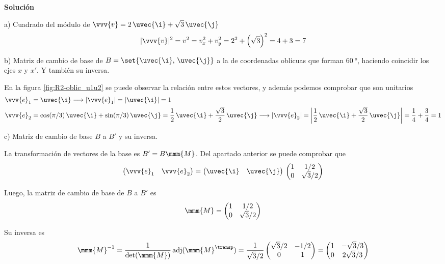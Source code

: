 \noindent
\textbf{Solución}

\noindent
a) Cuadrado del módulo de $\vvv{v} = 2\,\uvec{\i} + \sqrt{3}\,\uvec{\j}$
\[
  |\vvv{v}|^2 = v^2 = v_x^2 + v_y^2 = 2^2 + \left(\sqrt{3}\right)^2 = 4 + 3 = 7
\]

\noindent 
b) Matriz de cambio de base de $B=\set{\uvec{\i},\,\uvec{\j}}$ a la de coordenadas
oblicuas que forman $\qty{60}{\degree}$, haciendo coincidir los ejes $x$ y $x'$.
Y también su inversa.

En la figura \ref{fig:R2-oblic_u1u2} se puede observar la relación entre estos
vectores, y además podemos comprobar que son unitarios
\begin{align*}
  \vvv{e}_1
  &=
    \uvec{\i}
    \longrightarrow
    |\vvv{e}_1| = |\uvec{\i}|
    = 1\\
  \vvv{e}_2
  &=
    \cos(\pi/3)\,\uvec{\i} + \sin(\pi/3)\,\uvec{\j}
    = \dfrac{1}{2}\,\uvec{\i} + \dfrac{\sqrt{3}}{2}\,\uvec{\j}
    \longrightarrow
    |\vvv{e}_2| = \left|\dfrac{1}{2}\,\uvec{\i}+\dfrac{\sqrt{3}}{2}\,\uvec{\j}\right|
    = \dfrac{1}{4} + \dfrac{3}{4}
    = 1
\end{align*}

\noindent
c) Matriz de cambio de base $B$ a $B'$ y su inversa.

La transformación de vectores de la base es $B'=B \mmm{M}$.
Del apartado anterior se puede comprobar que
\[
  \begin{pmatrix}
    \vvv{e}_1 & \vvv{e}_2
  \end{pmatrix}
  = \begin{pmatrix}
    \uvec{\i} & \uvec{\j}
  \end{pmatrix}
  \,\begin{pmatrix}
    1 & 1/2\\
    0 & \sqrt{3}/2
  \end{pmatrix}
\]

Luego, la matriz de cambio de base de $B$ a $B'$ es
\[
  \mmm{M}
  = \begin{pmatrix}
    1 & 1/2\\
    0 & \sqrt{3}/2
  \end{pmatrix}
\]

Su inversa es
\[
  \mmm{M}^{-1}
  = \dfrac{1}{\det(\mmm{M})}\,
  \text{adj}(\mmm{M}^\transp)
  = \dfrac{1}{\sqrt{3}/2}
  \begin{pmatrix}
    \sqrt{3}/2 & -1/2\\
    0 & 1
  \end{pmatrix}
  = \begin{pmatrix}
    1 & -\sqrt{3}/3\\
    0 & 2\sqrt{3}/3
  \end{pmatrix}
\]

